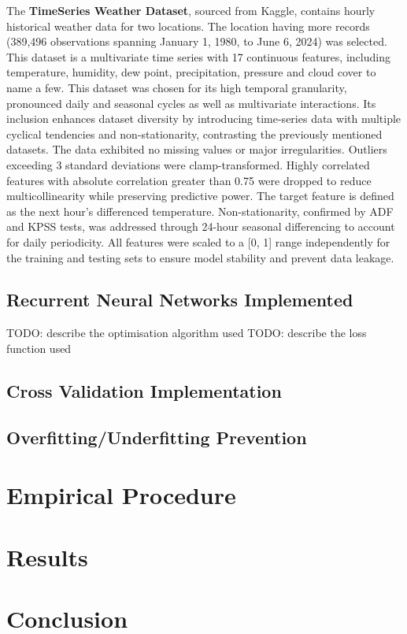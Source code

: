 \documentclass[conference, 10pt]{IEEEtran}
\begin{document}
The \textbf{TimeSeries Weather Dataset}, sourced from Kaggle, contains hourly historical weather data for two locations.
The location having more records (389,496 observations spanning January 1, 1980, to June 6, 2024) was selected. This
dataset is a multivariate time series with 17 continuous features, including temperature, humidity, dew point,
precipitation, pressure and cloud cover to name a few. This dataset was chosen for its high temporal granularity,
pronounced daily and seasonal cycles as well as multivariate interactions. Its inclusion enhances dataset diversity by
introducing time-series data with multiple cyclical tendencies and non-stationarity, contrasting the previously
mentioned datasets. The data exhibited no missing values or major irregularities. Outliers exceeding 3 standard
deviations were clamp-transformed. Highly correlated features with absolute correlation greater than 0.75 were dropped
to reduce multicollinearity while preserving predictive power. The target feature is defined as the next hour's
differenced temperature. Non-stationarity, confirmed by ADF and KPSS tests, was addressed through 24-hour seasonal
differencing to account for daily periodicity. All features were scaled to a [0, 1] range independently for the training
and testing sets to ensure model stability and prevent data leakage.

\subsection{Recurrent Neural Networks Implemented}
TODO: describe the optimisation algorithm used
TODO: describe the loss function used
\subsection{Cross Validation Implementation}

\subsection{Overfitting/Underfitting Prevention}


\section{Empirical Procedure}


\section{Results}

\section{Conclusion}
\cite{yahoosnp500}
\cite{yahoovix}
\cite{elec_cons}


\nocite{myrepo}

\end{document}
